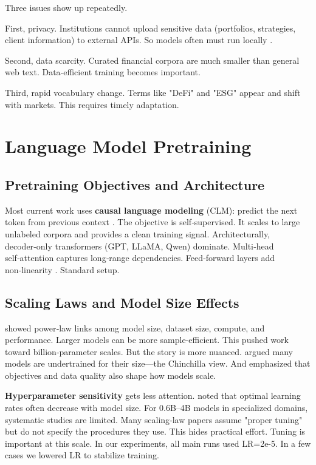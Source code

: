 Three issues show up repeatedly.

First, privacy. Institutions cannot upload sensitive data (portfolios, strategies, client information) to external APIs. So models often must run locally \parencite{wu2023bloomberggpt}.

Second, data scarcity. Curated financial corpora are much smaller than general web text. Data‑efficient training becomes important.

Third, rapid vocabulary change. Terms like "DeFi" and "ESG" appear and shift with markets. This requires timely adaptation.

\section{Language Model Pretraining}

\subsection{Pretraining Objectives and Architecture}

Most current work uses \textbf{causal language modeling} (CLM): predict the next token from previous context \parencite{radford2019language, brown2020language}. The objective is self‑supervised. It scales to large unlabeled corpora and provides a clean training signal. Architecturally, decoder‑only transformers (GPT, LLaMA, Qwen) dominate. Multi‑head self‑attention captures long‑range dependencies. Feed‑forward layers add non‑linearity \parencite{vaswani2017attention, touvron2023llama}. Standard setup.

\subsection{Scaling Laws and Model Size Effects}

\textcite{kaplan2020scaling} showed power‑law links among model size, dataset size, compute, and performance. Larger models can be more sample‑efficient. This pushed work toward billion‑parameter scales. But the story is more nuanced. \textcite{hoffmann2022training} argued many models are undertrained for their size—the Chinchilla view. And \textcite{tay2022ul2} emphasized that objectives and data quality also shape how models scale.

\textbf{Hyperparameter sensitivity} gets less attention. \textcite{mccandlish2018empirical} noted that optimal learning rates often decrease with model size. For 0.6B--4B models in specialized domains, systematic studies are limited. Many scaling‑law papers assume "proper tuning" but do not specify the procedures they use. This hides practical effort. Tuning is important at this scale. In our experiments, all main runs used LR=2e-5. In a few cases we lowered LR to stabilize training.

